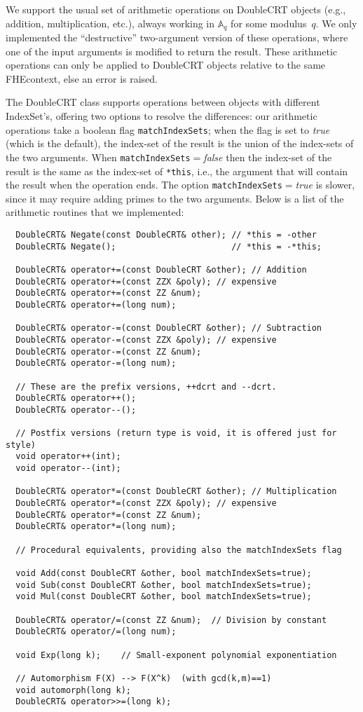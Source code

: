 \documentclass[14pt]{extarticle}
\newcommand{\A}{\mathbb{A}}
\def\IndexSet{\textsf{IndexSet}}
\def\DoubleCRT{\textsf{DoubleCRT}}
\def\FHEcontext{\textsf{FHEcontext}}
\begin{document}
We support the usual set of arithmetic operations on {\DoubleCRT}
objects (e.g., addition, multiplication, etc.), always working in
$\A_q$ for some modulus~$q$.  We only implemented the ``destructive''
two-argument version of these operations, where one of the input
arguments is modified to return the result.  These arithmetic
operations can only be applied to {\DoubleCRT} objects relative to the
same {\FHEcontext}, else an error is raised.

The
{\DoubleCRT} class supports operations between objects with different
{\IndexSet}'s, offering two options to resolve the differences: our
arithmetic operations take a boolean flag \texttt{matchIndexSets};
when the flag is set to \emph{true} (which is the default), the
index-set of the result is the union of the index-sets of the two
arguments. When \texttt{matchIndexSets}$=$\emph{false} then the
index-set of the result is the same as the index-set of \texttt{*this},
i.e., the argument that will contain the result when the operation
ends. The option \texttt{matchIndexSets}$=$\emph{true} is slower,
since it may require adding primes to the two arguments. Below is
a list of the arithmetic routines that we implemented:

\begin{verbatim}
  DoubleCRT& Negate(const DoubleCRT& other); // *this = -other
  DoubleCRT& Negate();                       // *this = -*this;

  DoubleCRT& operator+=(const DoubleCRT &other); // Addition
  DoubleCRT& operator+=(const ZZX &poly); // expensive
  DoubleCRT& operator+=(const ZZ &num);
  DoubleCRT& operator+=(long num);

  DoubleCRT& operator-=(const DoubleCRT &other); // Subtraction
  DoubleCRT& operator-=(const ZZX &poly); // expensive
  DoubleCRT& operator-=(const ZZ &num);
  DoubleCRT& operator-=(long num);

  // These are the prefix versions, ++dcrt and --dcrt. 
  DoubleCRT& operator++();
  DoubleCRT& operator--();

  // Postfix versions (return type is void, it is offered just for style)
  void operator++(int);
  void operator--(int);

  DoubleCRT& operator*=(const DoubleCRT &other); // Multiplication
  DoubleCRT& operator*=(const ZZX &poly); // expensive
  DoubleCRT& operator*=(const ZZ &num);
  DoubleCRT& operator*=(long num);

  // Procedural equivalents, providing also the matchIndexSets flag

  void Add(const DoubleCRT &other, bool matchIndexSets=true);
  void Sub(const DoubleCRT &other, bool matchIndexSets=true);
  void Mul(const DoubleCRT &other, bool matchIndexSets=true);

  DoubleCRT& operator/=(const ZZ &num);  // Division by constant
  DoubleCRT& operator/=(long num);

  void Exp(long k);    // Small-exponent polynomial exponentiation

  // Automorphism F(X) --> F(X^k)  (with gcd(k,m)==1)
  void automorph(long k);
  DoubleCRT& operator>>=(long k);
\end{verbatim}
\end{document}
